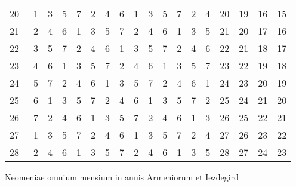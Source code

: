 \begin{tabnums}
\begin{tabular}[c]{@{} c  l l l l l l l l l l l l l  c c c c @{}}
20~  & 1 & 3 & 5 & 7 & 2 & 4 & 6 & 1 & 3 & 5 & 7 & 2 & 4 &  20 & 19 & 16 & 15 \\
21~  & 2 & 4 & 6 & 1 & 3 & 5 & 7 & 2 & 4 & 6 & 1 & 3 & 5 &  21 & 20 & 17 & 16 \\
22~  & 3 & 5 & 7 & 2 & 4 & 6 & 1 & 3 & 5 & 7 & 2 & 4 & 6 &  22 & 21 & 18 & 17 \\
23~  & 4 & 6 & 1 & 3 & 5 & 7 & 2 & 4 & 6 & 1 & 3 & 5 & 7 &  23 & 22 & 19 & 18 \\
24~  & 5 & 7 & 2 & 4 & 6 & 1 & 3 & 5 & 7 & 2 & 4 & 6 & 1 &  24 & 23 & 20 & 19 \\
25~  & 6 & 1 & 3 & 5 & 7 & 2 & 4 & 6 & 1 & 3 & 5 & 7 & 2 &  25 & 24 & 21 & 20 \\
26~  & 7 & 2 & 4 & 6 & 1 & 3 & 5 & 7 & 2 & 4 & 6 & 1 & 3 &  26 & 25 & 22 & 21 \\
27~  & 1 & 3 & 5 & 7 & 2 & 4 & 6 & 1 & 3 & 5 & 7 & 2 & 4 &  27 & 26 & 23 & 22 \\
28~  & 2 & 4 & 6 & 1 & 3 & 5 & 7 & 2 & 4 & 6 & 1 & 3 & 5 &  28 & 27 & 24 & 23 \\
%
\bottomrule
\end{tabular}
%
\caption{Neomeniae omnium mensium in annis Armeniorum et Iezdegird}
\label{tab:p216}
%
\end{tabnums}

